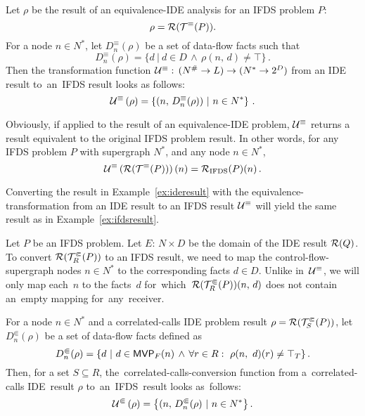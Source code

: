 {Let $\rho$ be the result of an equivalence-IDE analysis for an IFDS problem $P$:
\[
  \rho=\mathcal R(\mathcal T^\equiv(P)).
\]
For a node $n\in N^*$, let $D_n^\equiv(\rho)$ be a set of data-flow facts such that
\begin{equation}
  D_n^\equiv(\rho)=\{d\ |\ d\in D\,\wedge\,\rho(n,\,d)\ne\top\}\,.
\end{equation}
Then the transformation function
$\mathcal U^\equiv:\,(N^\#\to L)\to(N^*\to2^D)$
from an IDE result to~an~IFDS result looks as follows:
\begin{equation}
  \mathcal U^\equiv\left(\rho\right)=
    \left\{(n,\,D_n^\equiv(\rho))\ |\ n\in N^*\right\}\,.
\end{equation}

Obviously, if applied to the result of an equivalence-IDE problem, $\mathcal U^\equiv$ returns a result equivalent to the original IFDS problem result. In other words, for any IFDS problem $P$ with supergraph $N^*$, and any node $n\in N^*$,
\begin{equation}
  \mathcal U^\equiv\left(\mathcal R(\mathcal T^\equiv(P))\right)(n)=\mathcal R_{\text{IFDS}}(P)(n)\,.
\end{equation}

\begin{example}
  Converting the result in Example~\ref{ex:ideresult} with the equivalence-transformation from an IDE result to an IFDS result $\mathcal U^\equiv$ will yield the same result as in Example~\ref{ex:ifdsresult}.
\end{example}



Let $P$ be an IFDS problem. 
Let $E:\,N\times D$ be the domain of the IDE result $\mathcal R(Q)$.
To convert $\mathcal R(\mathcal T^\Subset_R(P))$ to an IFDS result, we need to map the control-flow-supergraph nodes $n\in N^*$ to the corresponding facts $d\in D$. 
Unlike in~$\mathcal U^\equiv$, we will only map each~$n$ to the facts~$d$ for~which~$\mathcal R(\mathcal T^\Subset_R(P))(n,\,d)$ does not contain an~empty mapping for~any~receiver. 

For a node $n\in N^*$ and a correlated-calls IDE problem result $\rho=\mathcal R(\mathcal T^\Subset_S(P))$, let $D_n^\Subset(\rho)$ be a set of data-flow facts defined as
\begin{equation}\label{eq:dnq}
  D_n^\Subset(\rho)=\left\{d\ |\ 
    d\in\mvp F(n)\,\wedge\,\forall r\in R:\ \rho(n,\ d)(r)\ne\top_T\right\}.
\end{equation}
Then, for a set $S\subseteq R$, the~correlated-calls-conversion function from a~correlated-calls IDE~result $\rho$ to~an~IFDS~result looks as~follows:
\begin{equation}\label{eq:ucc}
  \mathcal U^\Subset\left(\rho\right)=
    \left\{(n,\,D_n^\Subset(\rho)\ | \ n\in N^*\right\}.
\end{equation}
}

